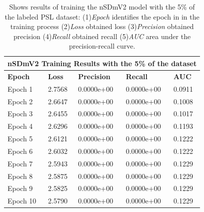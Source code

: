 \documentclass[twocolumn,conference]{article}
\begin{document}
\begin{table}
\captionsetup{font=footnotesize}
\centering
\begin{tabular}{ p{2.8cm} p{2.8cm} p{2.8cm} p{2.8cm} p{2.8cm} }
\toprule
\multicolumn{5}{c}{\textbf{nSDmV2 Training Results with the 5\% of the dataset}} \\
\hline
\hline
\textbf{Epoch}&	\textbf{Loss}	&\textbf{Precision}	&\textbf{Recall}	&\textbf{AUC} \\
\hline
\midrule
Epoch 1&	2.7568&	0.0000e+00&	0.0000e+00&	0.0911\\
Epoch 2&	2.6647&	0.0000e+00&	0.0000e+00&	0.1008\\
Epoch 3&	2.6455&	0.0000e+00&	0.0000e+00&	0.1017\\
Epoch 4&	2.6296&	0.0000e+00&	0.0000e+00&	0.1193\\
Epoch 5&	2.6121&	0.0000e+00&	0.0000e+00&	0.1222\\
Epoch 6&	2.6032&	0.0000e+00&	0.0000e+00&	0.1222\\
Epoch 7&	2.5943&	0.0000e+00&	0.0000e+00&	0.1229\\
Epoch 8&	2.5875&	0.0000e+00&	0.0000e+00&	0.1229\\
Epoch 9&	2.5825&	0.0000e+00&	0.0000e+00&	0.1229\\
Epoch 10&	2.5790&	0.0000e+00&	0.0000e+00&	0.1229\\
\bottomrule
\end{tabular}
\caption{Shows results of training the nSDmV2 model with the 5\% of the labeled PSL dataset: (1)\textit{Epoch} identifies the epoch in in the training process (2)\textit{Loss} obtained loss (3)\textit{Precision} obtained precision (4)\textit{Recall} obtained recall (5)\textit{AUC} area under the precision-recall curve.}
\label{tab:nSDmV2-detection-results-5-percent}
\end{table}
\end{document}

